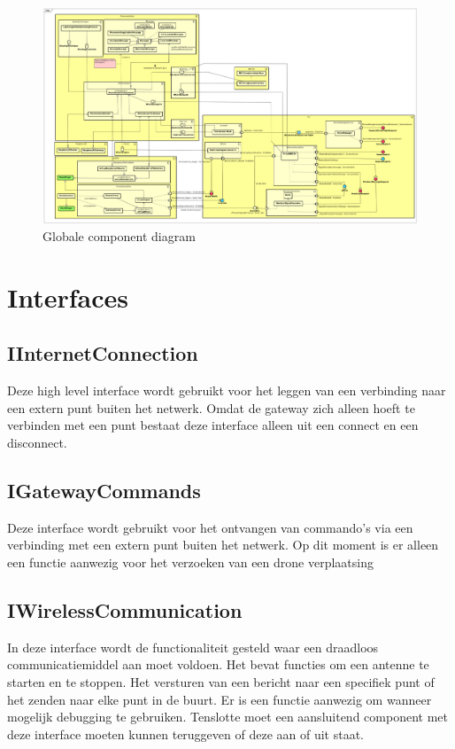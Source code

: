 \documentclass[a4paper, 11pt, oneside]{report}
\begin{document}
\begin{landscape}
	\begin{figure}[p]%
		\includegraphics[width=\linewidth]{Afbeeldingen/ComponentDiagram.png}%
		\caption{Globale component diagram}
			\label{fig:componentdiagram}
	\end{figure}%
\clearpage
\end{landscape}
\clearpage


\section{Interfaces}
\label{architectural:interfaces}
\subsection{IInternetConnection}
\label{architectural:interfaces:IInternetConnection}
Deze high level interface wordt gebruikt voor het leggen van een verbinding naar een extern punt buiten het netwerk. Omdat de gateway zich alleen hoeft te verbinden met een punt bestaat deze interface alleen uit een connect en een disconnect.
\subsection{IGatewayCommands}
\label{architectural:interfaces:IGatewayCommands}
Deze interface wordt gebruikt voor het ontvangen van commando's via een verbinding met een extern punt buiten het netwerk. Op dit moment is er alleen een functie aanwezig voor het verzoeken van een drone verplaatsing
\subsection{IWirelessCommunication}
\label{architectural:interfaces:IWirelessCommunication}
In deze interface wordt de functionaliteit gesteld waar een draadloos communicatiemiddel aan moet voldoen. Het bevat functies om een antenne te starten en te stoppen. Het versturen van een bericht naar een specifiek punt of het zenden naar elke punt in de buurt. Er is een functie aanwezig om wanneer mogelijk debugging te gebruiken. Tenslotte moet een aansluitend component met deze interface moeten kunnen teruggeven of deze aan of uit staat.
\end{document}
